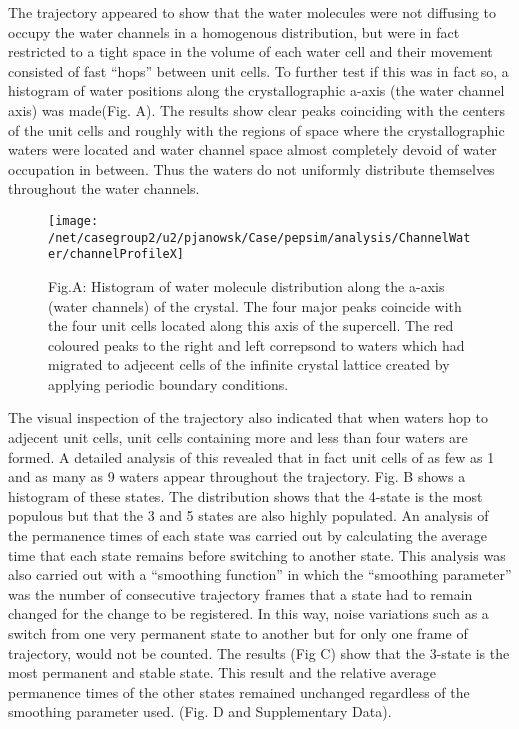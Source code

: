 \documentclass[12pt,letterpaper]{report}
\begin{document}
\begin{enumerate}
The trajectory appeared to show that the water molecules were not diffusing to occupy the water channels in a homogenous distribution, but were in fact restricted to a tight space in the volume of each water cell and their movement consisted of fast ``hops'' between unit cells. To further test if this was in fact so, a histogram of water positions along the crystallographic a-axis (the water channel axis) was made(Fig. A). The results show clear peaks coinciding with the centers of the unit cells and roughly with the regions of space where the crystallographic waters were located and water channel space almost completely devoid of water occupation in between. Thus the waters do not uniformly distribute themselves throughout the water channels.


	\begin{figure}[H]
	\centering
	\texttt{[image: /net/casegroup2/u2/pjanowsk/Case/pepsim/analysis/ChannelWater/channelProfileX]}
	\caption{Fig.A: Histogram of water molecule distribution along the a-axis (water channels) of the crystal. The four major peaks coincide with the four unit cells located along this axis of the supercell. The red coloured peaks to the right and left correpsond to waters which had migrated to adjecent cells of the infinite crystal lattice created by applying periodic boundary conditions.}
	\end{figure}
	
	
	
The visual inspection of the trajectory also indicated that when waters hop to adjecent unit cells, unit cells containing more and less than four waters are formed. A detailed analysis of this revealed that in fact unit cells of as few as 1 and as many as 9 waters appear throughout the trajectory. Fig. B shows a histogram of these states. The distribution shows that the 4-state is the most populous but that the 3 and 5 states are also highly populated. An analysis of the permanence times of each state was carried out by calculating the average time that each state remains before switching to another state. This analysis was also carried out with a ``smoothing function'' in which the ``smoothing parameter'' was the number of consecutive trajectory frames that a state had to remain changed for the change to be registered. In this way, noise variations such as a switch from one very permanent state to another but for only one frame of trajectory, would not be counted. The results (Fig C) show that the 3-state is the most permanent and stable state. This result and the relative average permanence times of the other states remained unchanged regardless of the smoothing parameter used. (Fig. D and Supplementary Data).


\end{enumerate}
\end{document}
